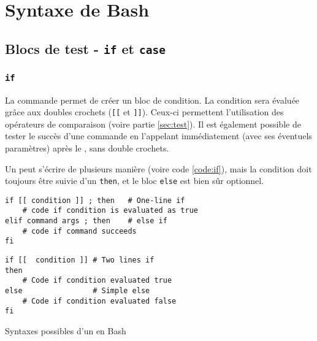 \section{Syntaxe de Bash}

\subsection{Blocs de test - \texttt{if} et \texttt{case}}

\subsubsection{\texttt{if}} 
La commande  permet de créer un bloc de condition. La condition sera évaluée grâce aux doubles crochets (\texttt{[[} et \texttt{]]}). Ceux-ci permettent l'utilisation des opérateurs de comparaison (voire partie \ref{sec:test}). Il est également possible de tester le succès d'une commande en l'appelant immédiatement (avec ses éventuels paramètres) après le , sans double crochets.

\begin{nscenter}
\end{nscenter}

Un  peut s'écrire de plusieurs manière (voire code \ref{code:if}), mais la condition doit toujours être suivie d'un \texttt{then}, et le bloc \texttt{else} est bien sûr optionnel.

\begin{code}
    \centering
    \noindent\begin{minipage}{.5\textwidth}
    \begin{verbatim}
if [[ condition ]] ; then   # One-line if
    # code if condition is evaluated as true
elif command args ; then    # else if
    # code if command succeeds
fi
\end{verbatim}
\end{minipage}\hfill
\begin{minipage}{.45\textwidth}
\begin{verbatim}
if [[  condition ]] # Two lines if
then
    # Code if condition evaluated true
else                # Simple else
    # Code if condition evaluated false
fi
\end{verbatim}
\end{minipage}\hfill
    \caption{Syntaxes possibles d'un  en Bash}
    \label{code:if}
\end{code}


